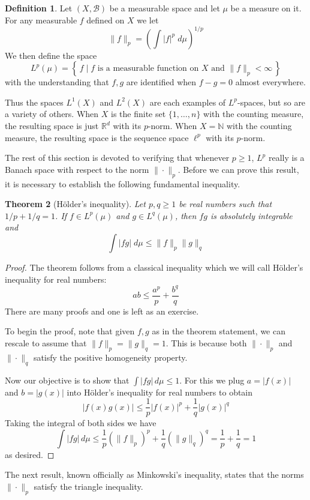 \documentclass[11pt,oneside]{amsbook}
\newcommand{\set}[1]{\left\{\,#1\,\right\}}
\newcommand{\NN}{{\mathbb N}}
\newcommand{\RR}{{\mathbb R}}
\theoremstyle{definition}
\theoremstyle{plain}
\newtheorem{thm}{Theorem}[section]
\theoremstyle{definition}
\newtheorem{defn}[thm]{Definition}
\theoremstyle{remark}
\numberwithin{equation}{section}
\numberwithin{figure}{section}
\begin{document}
\begin{defn}
  Let $(X,\mathcal B)$ be a measurable space and let $\mu$ be a measure on it. For any measurable $f$ defined on $X$ we let
  \[\|f\|_p=\left(\int|f|^p\;d\mu\right)^{1/p}
  \]
  We then define the space
  \[L^p(\mu)=\set{f\mid\text{$f$ is a measurable function on $X$ and } \|f\|_p<\infty}
  \]
  with the understanding that $f,g$ are identified when $f-g=0$ almost everywhere.
\end{defn}

Thus the spaces $L^1(X)$ and $L^2(X)$ are each examples of $L^p$-spaces, but so are a variety of others. When $X$ is the finite set $\{1,\ldots,n\}$ with the counting measure, the resulting space is just $\RR^d$ with its $p$-norm. When $X=\NN$ with the counting measure, the resulting space is the sequence space $\ell^p$ with its $p$-norm.

The rest of this section is devoted to verifying that whenever $p\geq1$, $L^p$ really is a Banach space with respect to the norm $\|\cdot\|_p$. Before we can prove this result, it is necessary to establish the following fundamental inequality.

\begin{thm}[H\"older's inequality]
  Let $p,q\geq1$ be real numbers such that $1/p+1/q=1$. If $f\in L^p(\mu)$ and $g\in L^q(\mu)$, then $fg$ is absolutely integrable and
  \[\int|fg|\;d\mu\leq\|f\|_p\|g\|_q
  \]
\end{thm}

\begin{proof}
  The theorem follows from a classical inequality which we will call H\"older's inequality for real numbers:
  \[ab\leq\frac{a^p}{p}+\frac{b^q}{q}
  \]
  There are many proofs and one is left as an exercise.

  To begin the proof, note that given $f,g$ as in the theorem statement, we can rescale to assume that $\|f\|_p=\|g\|_q=1$. This is because both $\|\cdot\|_p$ and $\|\cdot\|_q$ satisfy the positive homogeneity property.

  Now our objective is to show that $\int|fg|\,d\mu\leq1$. For this we plug $a=|f(x)|$ and $b=|g(x)|$ into H\"older's inequality for real numbers to obtain
  \[|f(x)g(x)|\leq\frac1p|f(x)|^p+\frac1q|g(x)|^q
  \]
  Taking the integral of both sides we have
  \[\int|fg|\,d\mu\leq\frac1p(\|f\|_p)^p+\frac1q(\|g\|_q)^q
    =\frac1p+\frac1q=1
  \]
  as desired.
\end{proof}

The next result, known officially as Minkowski's inequality, states that the norms $\|\cdot\|_p$ satisfy the triangle inequality.
\end{document}
